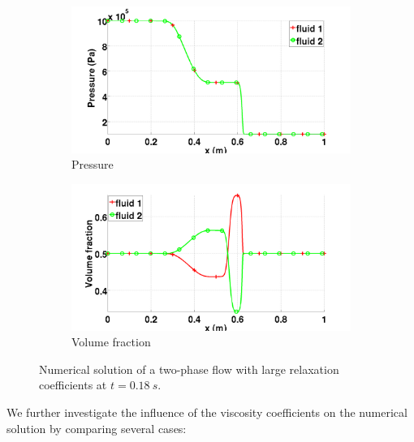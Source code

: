 \documentclass[preprint,10pt]{elsarticle}
\begin{document}
\begin{figure}[H]
        \begin{subfigure}[b]{0.495\textwidth}
                \centering
                \includegraphics[width=\textwidth]{../figures/paper/relaxation_two_phases_pressure_fo_lf.png}
                \caption{Pressure}
                \label{fig:two-phase-press}
        \end{subfigure}        
        \begin{subfigure}[b]{0.495\textwidth}
                \centering
                \includegraphics[width=\textwidth]{../figures/paper/relaxation_two_phases_volume_fraction_fo_lf.png}
                \caption{Volume fraction}
                \label{fig:two-phase-vf}
        \end{subfigure}
        \caption{Numerical solution of a two-phase flow with large relaxation coefficients at $t=0.18 \ s$.}\label{fig:two-phase}
\end{figure}
%
We further investigate the influence of the viscosity coefficients on the numerical solution by comparing several cases:
\end{document}
